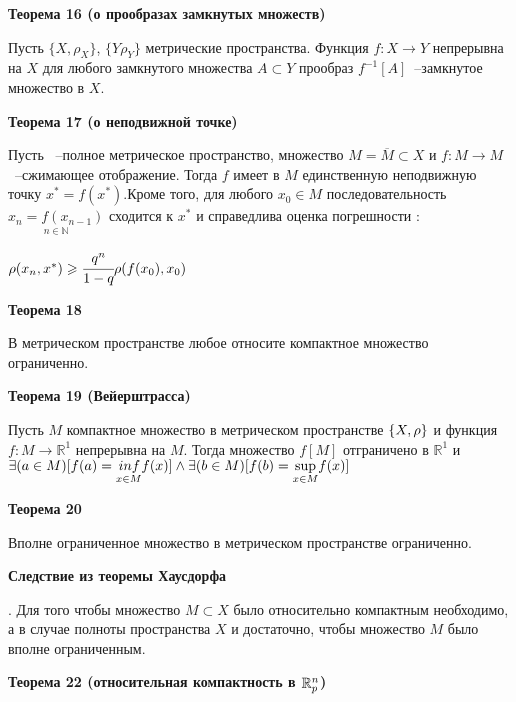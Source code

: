 \noindent\dotfill
    
\textbf{Теорема 16 (о прообразах замкнутых множеств)}

Пусть $\{X, \rho_X \}$, $\{Y \rho_Y \}$ метрические пространства. Функция $f:
    X \rightarrow Y$ непрерывна на $X$ \tttk для любого замкнутого множества $A \subset Y$
прообраз $f^{-1}[A]$~--замкнутое множество в $X$.

\noindent\dotfill
    
\textbf{Теорема 17 (о неподвижной точке) }

Пусть \mes~--полное метрическое пространство, множество $M= \overline M \subset X
    \text{ и } f:M \rightarrow M$~--сжимающее отображение. Тогда $f$ имеет в $M$
единственную неподвижную точку $x^*=f(x^*)$.Кроме того, для любого $x_0
    \in M $ последовательность $\underset{n \in \mathbb{N} }{x_n=f(x_{n-1})}$ сходится
к $x^*$ и справедлива оценка погрешности :

$\rho(x_n, x^*)\geqslant \cfrac{q^n}{1-q}\rho(f(x_0), x_0)$

\noindent\dotfill
    
\textbf{Теорема 18   }

В метрическом пространстве любое относите компактное множество ограниченно.

\noindent\dotfill
    
\textbf{Теорема 19 (Вейерштрасса)}

Пусть $M$ компактное множество в метрическом пространстве $\{X, \rho\}$ и функция
$f:M \rightarrow \mathbb{R}^1$ непрерывна на $M$. Тогда множество $f[M]$ отграничено в
$\mathbb{R}^1$ и $\exists(a \in M)[f(a)=\underset{x \in M}{\\inf} f(x)]\wedge
    \exists(b\in M)[f(b)=
        \underset{x \in M}{\sup} f(x)] $

        \noindent\dotfill
    
\textbf{Теорема 20}

Вполне ограниченное множество в метрическом пространстве ограниченно.

\noindent\dotfill
    
\textbf{Следствие из теоремы Хаусдорфа}

\MS. Для того чтобы множество $M \subset X$ было относительно компактным
необходимо, а в случае полноты пространства $X$ и достаточно, чтобы множество $M$
было вполне ограниченным.

\noindent\dotfill
    
\textbf{Теорема 22 (относительная компактность в $ \mathbb{R}^n_p $) }

